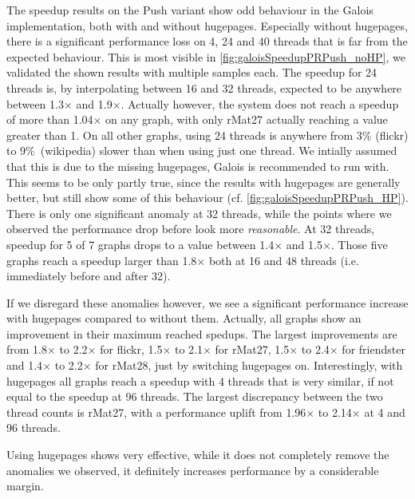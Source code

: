 The speedup results on the Push variant show odd behaviour in the Galois implementation, both with and without hugepages.
Especially without hugepages, there is a significant performance loss on 4, 24 and 40 threads that is far from the expected behaviour. This is most visible in \autoref{fig:galoisSpeedupPRPush_noHP}, we validated the shown results with multiple samples each.
The speedup for 24 threads is, by interpolating between 16 and 32 threads, expected to be anywhere between 1.3$\times$ and 1.9$\times$.
Actually however, the system does not reach a speedup of more than 1.04$\times$ on any graph, with only rMat27 actually reaching a value greater than 1.
On all other graphs, using 24 threads is anywhere from 3\% (flickr) to 9\%\ (wikipedia) slower than when using just one thread.
We intially assumed that this is due to the missing hugepages, Galois is recommended to run with. This seems to be only partly true, since the results with hugepages are generally better, but still show some of this behaviour (cf. \autoref{fig:galoisSpeedupPRPush_HP}).
There is only one significant anomaly at 32 threads, while the points where we observed the performance drop before look more \emph{reasonable}.
At 32 threads, speedup for 5 of 7 graphs drops to a value between 1.4$\times$ and 1.5$\times$. Those five graphs reach a speedup larger than 1.8$\times$ both at 16 and 48 threads (i.e. immediately before and after 32).

If we disregard these anomalies however, we see a significant performance increase with hugepages compared to without them. Actually, all graphs show an improvement in their maximum reached spedups. The largest improvements are from 1.8$\times$ to 2.2$\times$ for flickr, 1.5$\times$ to 2.1$\times$ for rMat27, 1.5$\times$ to 2.4$\times$ for friendster and 1.4$\times$ to 2.2$\times$ for rMat28, just by switching hugepages on.
Interestingly, with hugepages all graphs reach a speedup with 4 threads that is very similar, if not equal to the speedup at 96 threads. The largest discrepancy between the two thread counts is rMat27, with a performance uplift from 1.96$\times$ to 2.14$\times$ at 4 and 96 threads.

Using hugepages shows very effective, while it does not completely remove the anomalies we observed, it definitely increases performance by a considerable margin.
